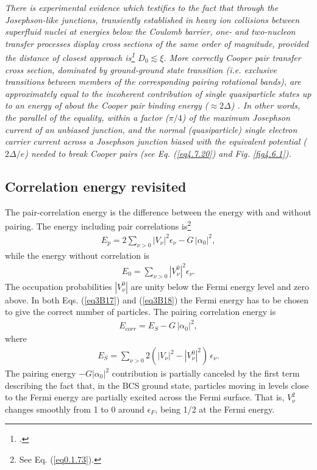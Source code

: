 \textit{There is experimental evidence which testifies to the fact that through the Josephson-like junctions, transiently established in heavy ion collisions between superfluid nuclei at energies below the Coulomb barrier, one- and two-nucleon transfer processes display cross sections of the same order of magnitude, provided the distance of closest approach is\footnote{\cite{Potel:20b}.} $D_0\lesssim\xi$.  More correctly Cooper pair transfer cross section, dominated by ground-ground state transition (i.e. exclusive transitions between members of the corresponding pairing rotational bands), are approximately equal to the incoherent contribution of single quasiparticle states up to an energy of about the Cooper pair binding energy ($\approx2\Delta$) . In other words, the parallel of the equality, within a factor ($\pi/4$) of the maximum Josephson current of an unbiased junction, and the normal (quasiparticle) single electron carrier current across a Josephson junction biased with the equivalent potential ($2\Delta/e$) needed to  break Cooper pairs (see Eq. (\ref{eq4.7.20}) and Fig. \ref{fig4.6.1}).} 
\subsection{Correlation energy revisited}\label{App3B4}
The pair-correlation energy is the difference between the energy with and without pairing. The energy including pair correlations is\footnote{See Eq. (\ref{eq0.1.73}).} 
 \begin{align}\label{eq3B17}
E_p=2\sum_{\nu>0}|V_\nu|^2\epsilon_\nu-G\,|\alpha_0|^2,
 \end{align} 
 while the energy without correlation is
  \begin{align}\label{eq3B18}
  E_0=\sum_{\nu>0}|V^0_\nu|^2\epsilon_\nu.
  \end{align} 
 The occupation probabilities $|V^0_\nu|$ are unity below the Fermi energy level and zero above. In both Eqs. (\ref{eq3B17}) and (\ref{eq3B18}) the Fermi energy has to be chosen to give the correct number of particles. The pairing correlation energy is 
   \begin{align}\label{eq3B19}
E_{corr}=E_S-G\,|\alpha_0|^2,
   \end{align} 
 where
   \begin{align}\label{eq3B20}
E_S=\sum_{\nu>0}2(|V_\nu|^2-|V^0_\nu|^2)\,\epsilon_\nu.
   \end{align}  
 The  pairing energy $-G|\alpha_0|^2$ contribution is partially canceled by the first term describing the fact that, in the BCS ground state, particles moving in levels close to the Fermi energy are partially excited across the Fermi surface. That is, $V_\nu^2$ changes smoothly from 1 to 0 around $\epsilon_F$, being 1/2 at the Fermi energy.
 
